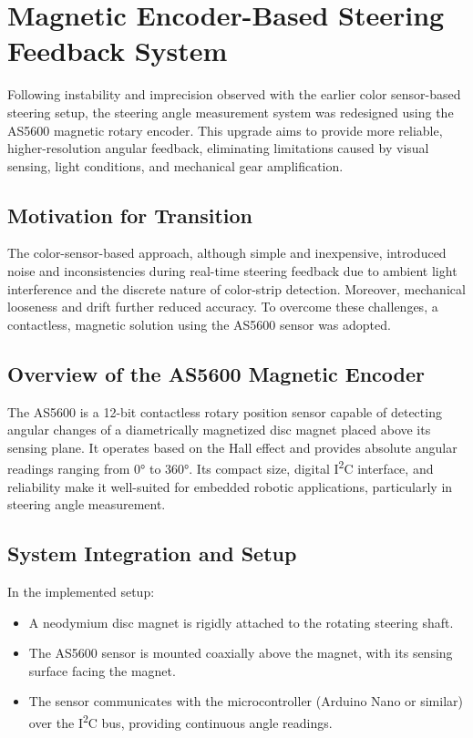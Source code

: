 \chapter{Magnetic Encoder-Based Steering Feedback System}

Following instability and imprecision observed with the earlier color sensor-based steering setup, the steering angle measurement system was redesigned using the AS5600 magnetic rotary encoder. This upgrade aims to provide more reliable, higher-resolution angular feedback, eliminating limitations caused by visual sensing, light conditions, and mechanical gear amplification.

\section{Motivation for Transition}

The color-sensor-based approach, although simple and inexpensive, introduced noise and inconsistencies during real-time steering feedback due to ambient light interference and the discrete nature of color-strip detection. Moreover, mechanical looseness and drift further reduced accuracy. To overcome these challenges, a contactless, magnetic solution using the AS5600 sensor was adopted.

\section{Overview of the AS5600 Magnetic Encoder}

The AS5600 is a 12-bit contactless rotary position sensor capable of detecting angular changes of a diametrically magnetized disc magnet placed above its sensing plane. It operates based on the Hall effect and provides absolute angular readings ranging from 0° to 360°. Its compact size, digital I\textsuperscript{2}C interface, and reliability make it well-suited for embedded robotic applications, particularly in steering angle measurement.

\section{System Integration and Setup}

In the implemented setup:
\begin{itemize}
    \item A neodymium disc magnet is rigidly attached to the rotating steering shaft.
    \item The AS5600 sensor is mounted coaxially above the magnet, with its sensing surface facing the magnet.
    \item The sensor communicates with the microcontroller (Arduino Nano or similar) over the I\textsuperscript{2}C bus, providing continuous angle readings.
\end{itemize}


